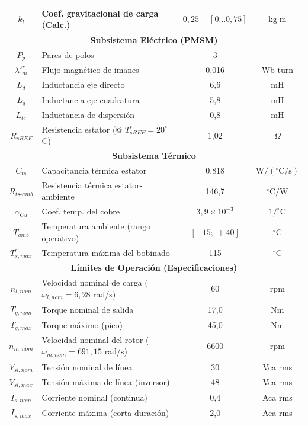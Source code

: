 \documentclass[12pt, a4paper,journal, onecolumn, compsoc]{IEEEtran}
\begin{document}
\begin{table}[htbp]
\begin{tabular}{|c|l|c|c|}
        $k_l$ & Coef. gravitacional de carga (Calc.) & $0{,}25 + [0\ldots0{,}75]$ & $\text{kg}\cdot\text{m}$ \\
        \hline
        \multicolumn{4}{|c|}{\textbf{Subsistema Eléctrico (PMSM)}} \\
        \hline
        $P_p$ & Pares de polos & 3 & - \\
        $\lambda'^r_m$ & Flujo magnético de imanes & 0{,}016 & Wb-turn \\
        $L_d$ & Inductancia eje directo & 6{,}6 & mH \\
        $L_q$ & Inductancia eje cuadratura & 5{,}8 & mH \\
        $L_{ls}$ & Inductancia de dispersión & 0{,}8 & mH \\
        $R_{sREF}$ & Resistencia estator (@ $T_{sREF}^\circ=20^\circ$C) & 1{,}02 & $\Omega$ \\
        \hline
        \multicolumn{4}{|c|}{\textbf{Subsistema Térmico}} \\
        \hline
        $C_{ts}$ & Capacitancia térmica estator & 0{,}818 & $\text{W}/(^\circ\text{C}/\text{s})$ \\
        $R_{ts\text{-}amb}$ & Resistencia térmica estator-ambiente & 146{,}7 & $^\circ\text{C}/\text{W}$ \\
        $\alpha_{Cu}$ & Coef. temp. del cobre & $3{,}9 \times 10^{-3}$ & $1/^\circ\text{C}$ \\
        $T_{amb}^\circ$ & Temperatura ambiente (rango operativo) & $[-15;\,+40]$ & $^\circ\text{C}$ \\
        $T^\circ_{s,max}$ & Temperatura máxima del bobinado & 115 & $^\circ\text{C}$ \\
        \hline
        \multicolumn{4}{|c|}{\textbf{Límites de Operación (Especificaciones)}} \\
        \hline
        $n_{l,nom}$ & Velocidad nominal de carga ($\omega_{l,nom}=6{,}28$ rad/s) & 60 & rpm \\
        $T_{q,nom}$ & Torque nominal de salida & 17{,}0 & Nm \\
        $T_{q,max}$ & Torque máximo (pico) & 45{,}0 & Nm \\
        $n_{m,nom}$ & Velocidad nominal del rotor ($\omega_{m,nom}=691{,}15$ rad/s) & 6600 & rpm \\
        $V_{sl,nom}$ & Tensión nominal de línea & 30 & Vca rms \\
        $V_{sl,max}$ & Tensión máxima de línea (inversor) & 48 & Vca rms \\
        $I_{s,nom}$ & Corriente nominal (continua) & 0{,}4 & Aca rms \\
        $I_{s,max}$ & Corriente máxima (corta duración) & 2{,}0 & Aca rms \\
        \hline
    \end{tabular}
    \label{tab:parametros}
\end{table}
\end{document}
